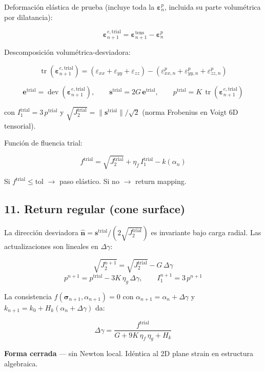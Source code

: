 \documentclass[11pt,letterpaper,oneside]{report}
\begin{document}
Deformación elástica de prueba (incluye toda la $\boldsymbol\varepsilon^p_n$, incluida su parte volumétrica por dilatancia):

\[
\boldsymbol\varepsilon^{e,\text{trial}}_{n+1} = \boldsymbol\varepsilon^\text{tens}_{n+1} - \boldsymbol\varepsilon^p_n
\]

Descomposición volumétrica-desviadora:

\[
\operatorname{tr}(\boldsymbol\varepsilon^{e,\text{trial}}_{n+1}) = (\varepsilon_{xx} + \varepsilon_{yy} + \varepsilon_{zz}) - (\varepsilon^p_{xx,n} + \varepsilon^p_{yy,n} + \varepsilon^p_{zz,n})
\]

\[
\mathbf e^\text{trial} = \operatorname{dev}(\boldsymbol\varepsilon^{e,\text{trial}}_{n+1}), \qquad \mathbf s^\text{trial} = 2G\,\mathbf e^\text{trial}, \qquad p^\text{trial} = K\,\operatorname{tr}(\boldsymbol\varepsilon^{e,\text{trial}}_{n+1})
\]

con $I_1^\text{trial} = 3\,p^\text{trial}$ y $\sqrt{J_2^\text{trial}} = \|\mathbf s^\text{trial}\|/\sqrt{2}$ (norma Frobenius en Voigt 6D tensorial).

Función de fluencia trial:

\[
f^\text{trial} = \sqrt{J_2^\text{trial}} + \eta_f\,I_1^\text{trial} - k(\alpha_n)
\]

Si $f^\text{trial} \leq \text{tol}$ \ensuremath{\to} paso elástico. Si no \ensuremath{\to} return mapping.

\subsection{11. Return regular (cone surface)}

La dirección desviadora $\hat{\mathbf n} = \mathbf s^\text{trial}/(2\sqrt{J_2^\text{trial}})$ es invariante bajo carga radial. Las actualizaciones son lineales en $\Delta\gamma$:

\[
\sqrt{J_2^{n+1}} = \sqrt{J_2^\text{trial}} - G\,\Delta\gamma
\]
\[
p^{n+1} = p^\text{trial} - 3K\,\eta_g\,\Delta\gamma, \qquad I_1^{n+1} = 3\,p^{n+1}
\]

La consistencia $f(\boldsymbol\sigma_{n+1}, \alpha_{n+1}) = 0$ con $\alpha_{n+1} = \alpha_n + \Delta\gamma$ y $k_{n+1} = k_0 + H_k(\alpha_n + \Delta\gamma)$ da:

\[
\boxed{\;\Delta\gamma = \frac{f^\text{trial}}{G + 9K\,\eta_f\,\eta_g + H_k}\;}
\]

\textbf{Forma cerrada} --- sin Newton local. Idéntica al 2D plane strain en estructura algebraica.
\end{document}
